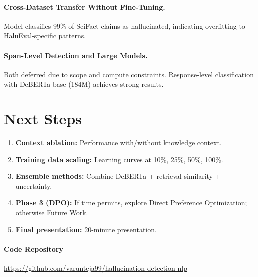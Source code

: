 \documentclass[11pt]{article}
\begin{document}
\paragraph{Cross-Dataset Transfer Without Fine-Tuning.} Model classifies 99\% of SciFact claims as hallucinated, indicating overfitting to HaluEval-specific patterns.

\paragraph{Span-Level Detection and Large Models.} Both deferred due to scope and compute constraints. Response-level classification with DeBERTa-base (184M) achieves strong results.

\section{Next Steps}

\begin{enumerate}
    \item \textbf{Context ablation:} Performance with/without knowledge context.
    \item \textbf{Training data scaling:} Learning curves at 10\%, 25\%, 50\%, 100\%.
    \item \textbf{Ensemble methods:} Combine DeBERTa + retrieval similarity + uncertainty.
    \item \textbf{Phase 3 (DPO):} If time permits, explore Direct Preference Optimization; otherwise Future Work.
    \item \textbf{Final presentation:} 20-minute presentation.
\end{enumerate}

\paragraph{Code Repository} \url{https://github.com/varunteja99/hallucination-detection-nlp}


\end{document}
